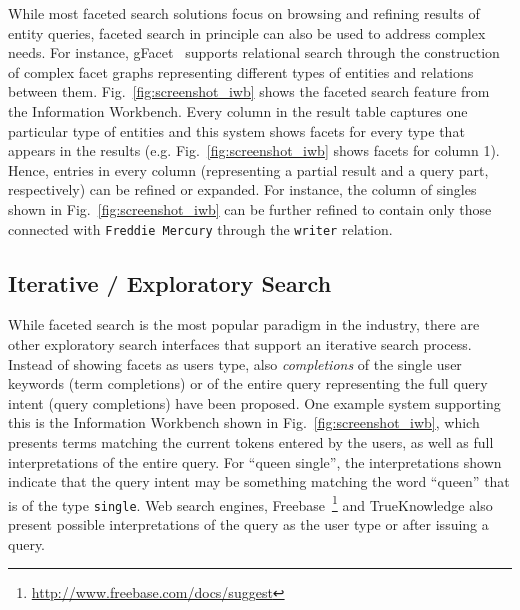 While most faceted search solutions focus on browsing and refining results of entity queries, faceted search in principle can also be used to address complex needs. For instance, gFacet~\cite{DBLP:conf/esws/HeimEZ10} supports relational search through the construction of complex facet graphs representing different types of entities and relations between them. Fig.~\ref{fig:screenshot_iwb} shows the faceted search feature from the Information Workbench. Every column in the result table captures one particular type of entities and this system shows facets for every type that appears in the results (e.g. Fig.~\ref{fig:screenshot_iwb} shows facets for column 1). Hence, entries in every column (representing a partial result and a query part, respectively) can be refined or expanded. For instance, the column of singles shown in Fig.~\ref{fig:screenshot_iwb} can be further refined to contain only those connected with \verb+Freddie Mercury+ through the \verb+writer+ relation. 

\subsection{Iterative / Exploratory Search} 
While faceted search is the most popular paradigm in the industry, there are other exploratory search interfaces that support an iterative search process. Instead of showing facets as users type, also \emph{completions} of the single user keywords (term completions) or of the entire query representing the full query intent (query completions) have been proposed. One example system supporting this is the Information Workbench shown in Fig.~\ref{fig:screenshot_iwb}, which presents terms matching the current tokens entered by the users, as well as full interpretations of the entire query. For ``queen single'', the interpretations shown indicate that the query intent may be something matching the word ``queen'' that is of the type \verb+single+. 
Web search engines, Freebase~\footnote{\url{http://www.freebase.com/docs/suggest}} and TrueKnowledge also present possible interpretations of the query as the user type or after issuing a query. 



